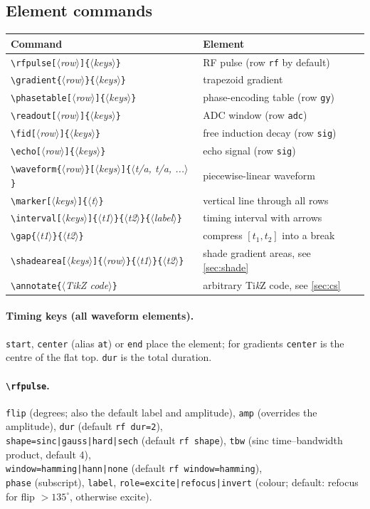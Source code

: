 \documentclass[11pt]{article}
\newcommand\cs[1]{\texttt{\textbackslash#1}}
\newcommand\key[1]{\texttt{#1}}
\newcommand\meta[1]{\ensuremath{\langle}\textit{#1}\ensuremath{\rangle}}
\newcommand\marg[1]{\texttt{\{}\meta{#1}\texttt{\}}}
\newcommand\oarg[1]{\texttt{[}\meta{#1}\texttt{]}}
\begin{document}
\subsection{Element commands}
\begin{center}\small
\begin{tabularx}{\linewidth}{@{}lX@{}}
\toprule
Command & Element \\
\midrule
\cs{rfpulse}\oarg{row}\marg{keys}         & RF pulse (row \texttt{rf} by default) \\
\cs{gradient}\marg{row}\marg{keys}        & trapezoid gradient \\
\cs{phasetable}\oarg{row}\marg{keys}      & phase-encoding table (row \texttt{gy}) \\
\cs{readout}\oarg{row}\marg{keys}         & ADC window (row \texttt{adc}) \\
\cs{fid}\oarg{row}\marg{keys}             & free induction decay (row \texttt{sig}) \\
\cs{echo}\oarg{row}\marg{keys}            & echo signal (row \texttt{sig}) \\
\cs{waveform}\marg{row}\oarg{keys}\marg{t/a, t/a, ...} & piecewise-linear waveform \\
\cs{marker}\oarg{keys}\marg{t}            & vertical line through all rows \\
\cs{interval}\oarg{keys}\marg{t1}\marg{t2}\marg{label} & timing interval with arrows \\
\cs{gap}\marg{t1}\marg{t2}                & compress $[t_1,t_2]$ into a break \\
\cs{shadearea}\oarg{keys}\marg{row}\marg{t1}\marg{t2} & shade gradient areas, see \ref{sec:shade} \\
\cs{annotate}\marg{TikZ code}             & arbitrary Ti\emph{k}Z code, see \ref{sec:cs} \\
\bottomrule
\end{tabularx}
\end{center}

\paragraph{Timing keys (all waveform elements).}
\key{start}, \key{center} (alias \key{at}) or \key{end} place the element;
for gradients \key{center} is the centre of the flat top. \key{dur} is the
total duration.

\paragraph{\cs{rfpulse}.}
\key{flip} (degrees; also the default label and amplitude), \key{amp}
(overrides the amplitude), \key{dur} (default \key{rf dur=2}),\\
\key{shape=sinc|gauss|hard|sech} (default \key{rf shape}), \key{tbw}
(sinc time--bandwidth product, default 4),\\ \key{window=hamming|hann|none}
(default \key{rf window=hamming}),\\ \key{phase} (subscript), \key{label},
\key{role=excite|refocus|invert} (colour; default: refocus for flip $>135^\circ$,
otherwise excite).
\end{document}
